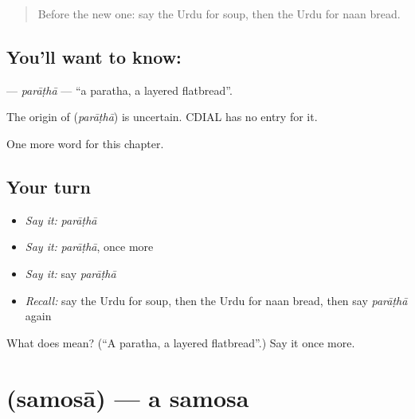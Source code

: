 \label{lesson:UR-C119-paratha}



\begin{quote}
Before the new one: say the Urdu for soup, then the Urdu for naan bread.
\end{quote}

\subsection*{You'll want to know: }
\textbf{} — \emph{parāṭhā} — \textquotedblleft{}a paratha, a layered flatbread\textquotedblright{}.

\begin{cousinweb}
The origin of \textbf{} (\emph{parāṭhā}) is uncertain. CDIAL has no entry for it.
\end{cousinweb}

\begin{grammarlens}[title={What you've built}]
One more word for this chapter.
\end{grammarlens}

\subsection*{Your turn}
\begin{itemize}
\raggedright
  \item \emph{Say it:} \emph{parāṭhā}
  \item \emph{Say it:} \emph{parāṭhā}, once more
  \item \emph{Say it:} say \emph{parāṭhā}
  \item \emph{Recall:} say the Urdu for soup, then the Urdu for naan bread, then say \emph{parāṭhā} again
\end{itemize}

\begin{tcolorbox}[breakable,colback=teal!4,colframe=teal!35!black,title={Before you move on}]
What does  mean? (\textquotedblleft{}A paratha, a layered flatbread\textquotedblright{}.) Say it once more.
\end{tcolorbox}
\section[\texorpdfstring{\ur{سموسہ} (samosā)}{سموسہ (samosā)}]{ (samosā) — a samosa}

\label{lesson:UR-C119-samosa}




